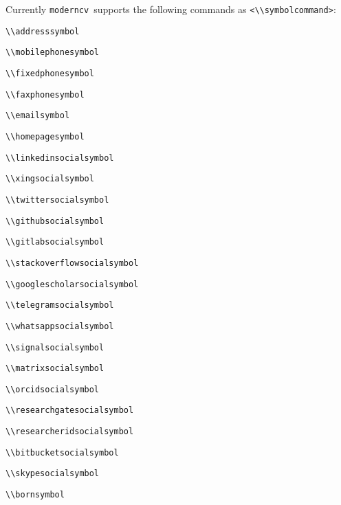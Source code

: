 \documentclass[a4paper, 11pt]{article}
\newcommand{\code}[1]{\lstinline!#1!}
\newcommand{\moderncv}{\code{moderncv}}
\newcommand{\Moderncv}{\moderncv~}
\begin{document}
Currently \Moderncv supports the following commands as \code{<\\symbolcommand>}:
\begin{itemize}
  \begin{multicols}{2}
    \item \code{\\addresssymbol}
    \item \code{\\mobilephonesymbol}
    \item \code{\\fixedphonesymbol}
    \item \code{\\faxphonesymbol}
    \item \code{\\emailsymbol}
    \item \code{\\homepagesymbol}
    \item \code{\\linkedinsocialsymbol}
    \item \code{\\xingsocialsymbol}
    \item \code{\\twittersocialsymbol}
    \item \code{\\githubsocialsymbol}
    \item \code{\\gitlabsocialsymbol}
    \item \code{\\stackoverflowsocialsymbol}
    \item \code{\\googlescholarsocialsymbol}
    \item \code{\\telegramsocialsymbol}
    \item \code{\\whatsappsocialsymbol}
    \item \code{\\signalsocialsymbol}
    \item \code{\\matrixsocialsymbol}
    \item \code{\\orcidsocialsymbol}
    \item \code{\\researchgatesocialsymbol}
    \item \code{\\researcheridsocialsymbol}
    \item \code{\\bitbucketsocialsymbol}
    \item \code{\\skypesocialsymbol}
    \item \code{\\bornsymbol}
  \end{multicols}
\end{itemize}
\end{document}
